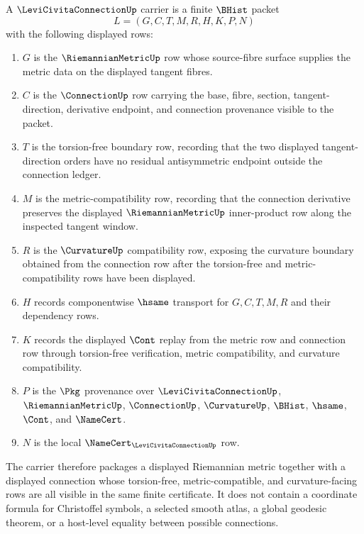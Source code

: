 \begin{definition}
\label{def:levi-civita-connection-carrier}
A $\LeviCivitaConnectionUp$ carrier is a finite $\BHist$ packet
$$
L=(G,C,T,M,R,H,K,P,N)
$$
with the following displayed rows:
\begin{enumerate}
\item $G$ is the $\RiemannianMetricUp$ row whose source-fibre surface supplies the metric data on the displayed tangent fibres.
\item $C$ is the $\ConnectionUp$ row carrying the base, fibre, section, tangent-direction, derivative endpoint, and connection provenance visible to the packet.
\item $T$ is the torsion-free boundary row, recording that the two displayed tangent-direction orders have no residual antisymmetric endpoint outside the connection ledger.
\item $M$ is the metric-compatibility row, recording that the connection derivative preserves the displayed $\RiemannianMetricUp$ inner-product row along the inspected tangent window.
\item $R$ is the $\CurvatureUp$ compatibility row, exposing the curvature boundary obtained from the connection row after the torsion-free and metric-compatibility rows have been displayed.
\item $H$ records componentwise $\hsame$ transport for $G,C,T,M,R$ and their dependency rows.
\item $K$ records the displayed $\Cont$ replay from the metric row and connection row through torsion-free verification, metric compatibility, and curvature compatibility.
\item $P$ is the $\Pkg$ provenance over $\LeviCivitaConnectionUp$, $\RiemannianMetricUp$, $\ConnectionUp$, $\CurvatureUp$, $\BHist$, $\hsame$, $\Cont$, and $\NameCert$.
\item $N$ is the local $\NameCert_{\LeviCivitaConnectionUp}$ row.
\end{enumerate}
The carrier therefore packages a displayed Riemannian metric together with a displayed connection whose torsion-free, metric-compatible, and curvature-facing rows are all visible in the same finite certificate. It does not contain a coordinate formula for Christoffel symbols, a selected smooth atlas, a global geodesic theorem, or a host-level equality between possible connections.
\end{definition}

